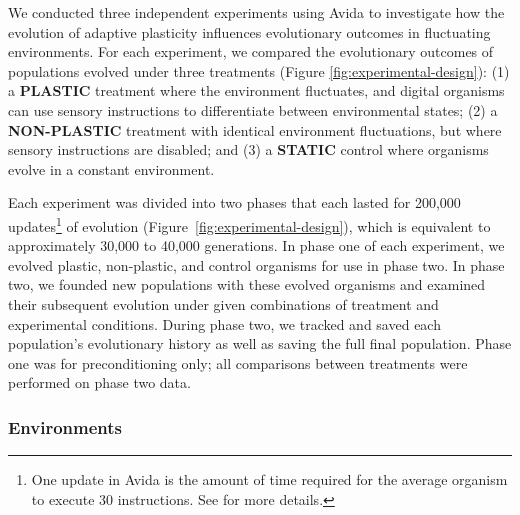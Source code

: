 \documentclass[utf8]{frontiersSCNS} %
\begin{document}
\begin{raggedbottom}

We conducted three independent experiments using Avida to investigate how the evolution of adaptive plasticity influences evolutionary outcomes in fluctuating environments.
For each experiment, we compared the evolutionary outcomes of populations evolved under three treatments (Figure \ref{fig:experimental-design}):
(1) a \textbf{PLASTIC} treatment where the environment fluctuates, and digital organisms can use sensory instructions to differentiate between environmental states;
(2) a \textbf{NON-PLASTIC} treatment with identical environment fluctuations, but where sensory instructions are disabled;
and (3) a \textbf{STATIC} control where organisms evolve in a constant environment.

Each experiment was divided into two phases that each lasted for 200,000 updates\footnote{
    One update in Avida is the amount of time required for the average organism to execute 30 instructions.
    See \citep{ofria_avida:_2009} for more details.
} of evolution (Figure~\ref{fig:experimental-design}), which is equivalent to approximately 30,000 to 40,000 generations.
In phase one of each experiment, we evolved plastic, non-plastic, and control organisms for use in phase two.
In phase two, we founded new populations with these evolved organisms and examined their subsequent evolution under given combinations of treatment and experimental conditions.
During phase two, we tracked and saved each population's evolutionary history as well as saving the full final population.
Phase one was for preconditioning only; all comparisons between treatments were performed on phase two data.

\subsubsection{Environments}
\label{sec:methods:experiment:environments}



\end{raggedbottom}
\end{document}
